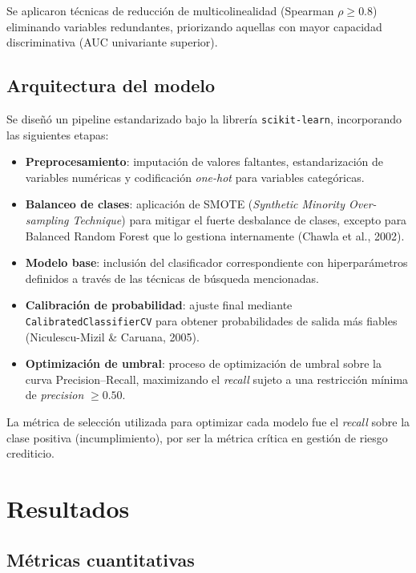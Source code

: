 \documentclass[journal]{apa7}
\begin{document}
Se aplicaron técnicas de reducción de multicolinealidad (Spearman $\rho \geq 0.8$) eliminando variables redundantes, priorizando aquellas con mayor capacidad discriminativa (AUC univariante superior).

\subsection{Arquitectura del modelo}

Se diseñó un pipeline estandarizado bajo la librería \texttt{scikit-learn}, incorporando las siguientes etapas:

\begin{itemize}
  \item \textbf{Preprocesamiento}: imputación de valores faltantes, estandarización de variables numéricas y codificación \emph{one-hot} para variables categóricas.
  \item \textbf{Balanceo de clases}: aplicación de SMOTE (\emph{Synthetic Minority Over-sampling Technique}) para mitigar el fuerte desbalance de clases, excepto para Balanced Random Forest que lo gestiona internamente (Chawla et al., 2002).
  \item \textbf{Modelo base}: inclusión del clasificador correspondiente con hiperparámetros definidos a través de las técnicas de búsqueda mencionadas.
  \item \textbf{Calibración de probabilidad}: ajuste final mediante \texttt{CalibratedClassifierCV} para obtener probabilidades de salida más fiables (Niculescu-Mizil \& Caruana, 2005).
  \item \textbf{Optimización de umbral}: proceso de optimización de umbral sobre la curva Precision–Recall, maximizando el \emph{recall} sujeto a una restricción mínima de \emph{precision} $\geq 0.50$.
\end{itemize}

La métrica de selección utilizada para optimizar cada modelo fue el \emph{recall} sobre la clase positiva (incumplimiento), por ser la métrica crítica en gestión de riesgo crediticio.

\section{Resultados}

\subsection{Métricas cuantitativas}
\end{document}
